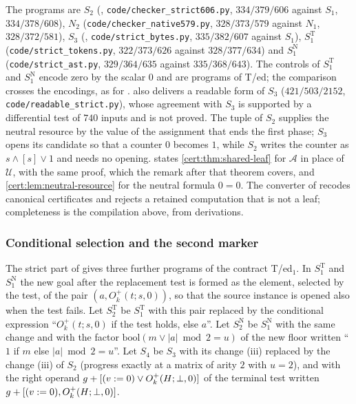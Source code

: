 The programs are $S_2$ (,
\texttt{code/checker\_strict606.py}, $334/379/606$ against $S_1$, $334/378/608$),
$N_2$ (\texttt{code/checker\_native579.py}, $328/373/579$ against $N_1$,
$328/372/581$), $S_3$ (, \texttt{code/strict\_bytes.py},
$335/382/607$ against $S_1$), $S^{\mathrm T}_1$ (\texttt{code/strict\_tokens.py},
$322/373/626$ against $328/377/634$) and $S^{\mathrm N}_1$
(\texttt{code/strict\_ast.py}, $329/364/635$ against $335/368/643$). The controls
of $S^{\mathrm T}_1$ and $S^{\mathrm N}_1$ encode zero by the scalar $0$ and are
programs of T/ed; the comparison crosses the encodings, as for
.  also delivers a readable form of $S_3$
($421/503/2152$, \texttt{code/readable\_strict.py}), whose agreement with $S_3$ is
supported by a differential test of $740$ inputs and is not proved. The tuple of
$S_2$ supplies the neutral resource by the value of the assignment that ends the
first phase; $S_3$ opens its candidate so that a counter $0$ becomes $1$, while
$S_2$ writes the counter as $s\land[s]\lor 1$ and needs no opening.
 states \cref{cert:thm:shared-leaf} for $\mathcal A$ in
place of $\mathcal U$, with the same proof, which the remark after that theorem
covers, and \cref{cert:lem:neutral-resource} for the neutral formula $0=0$. The
converter of 
recodes canonical certificates and rejects a retained computation that is not a
leaf; completeness is the compilation above, from derivations.

\subsubsection*{Conditional selection and the second marker}

The strict part of  gives three further programs
of the contract T/ed$_1$. In $S^{\mathrm T}_1$ and $S^{\mathrm N}_1$ the new goal
after the replacement test is formed as the element, selected by the test, of
the pair $(a,O^{+}_k(t;s,0))$, so that the source instance is opened also when
the test fails. Let $S^{\mathrm T}_2$ be $S^{\mathrm T}_1$ with this pair
replaced by the conditional expression ``$O^{+}_k(t;s,0)$ if the test holds,
else $a$''. Let $S^{\mathrm N}_2$ be $S^{\mathrm N}_1$ with the same change and
with the factor $\mathrm{bool}(m\lor\lvert a\rvert\bmod 2=u)$ of the new floor
written ``$1$ if $m$ else $\lvert a\rvert\bmod 2=u$''. Let $S_4$ be $S_3$ with
its change (iii) replaced by the change (iii) of $S_2$ (progress exactly at a
matrix of arity $2$ with $u=2$), and with the right operand
$g+[(v\mathrel{:=} 0)\lor O^{+}_k(H;\bot,0)]$ of the terminal test written
$g+[(v\mathrel{:=} 0),O^{+}_k(H;\bot,0)]$.


